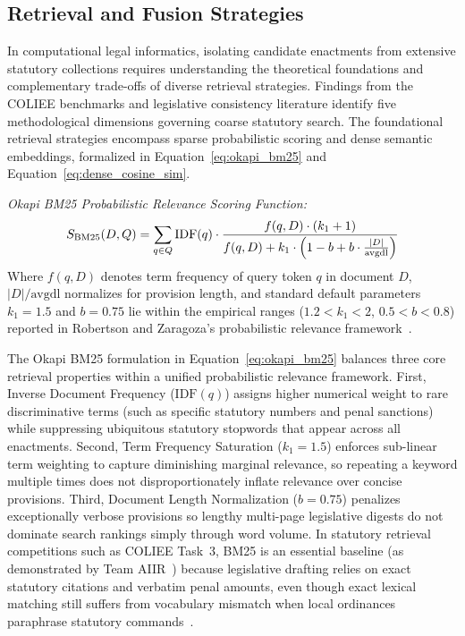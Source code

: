     \subsection{Retrieval and Fusion Strategies}
    \label{sec:retrieval_paradigms_fusion}
    In computational legal informatics, isolating candidate enactments from extensive statutory collections requires understanding the theoretical foundations and complementary trade-offs of diverse retrieval strategies. Findings from the COLIEE benchmarks and legislative consistency literature identify five methodological dimensions governing coarse statutory search. The foundational retrieval strategies encompass sparse probabilistic scoring and dense semantic embeddings, formalized in Equation~\eqref{eq:okapi_bm25} and Equation~\eqref{eq:dense_cosine_sim}.

    \noindent\textit{Okapi BM25 Probabilistic Relevance Scoring Function:}
    \begin{equation}
        S_{\text{BM25}}(D, Q) = \sum_{q \in Q} \text{IDF}(q) \cdot \frac{f(q, D) \cdot (k_1 + 1)}{f(q, D) + k_1 \cdot \left(1 - b + b \cdot \frac{|D|}{\text{avgdl}}\right)}
        \label{eq:okapi_bm25}
        \eqcaption{Okapi BM25 Probabilistic Relevance Scoring Function}
    \end{equation}
    \noindent Where $f(q, D)$ denotes term frequency of query token $q$ in document $D$, $|D|/\text{avgdl}$ normalizes for provision length, and standard default parameters $k_1 = 1.5$ and $b = 0.75$ lie within the empirical ranges ($1.2 < k_1 < 2$, $0.5 < b < 0.8$) reported in Robertson and Zaragoza's probabilistic relevance framework~\cite{robertson2009probabilistic}. 
    
    The Okapi BM25 formulation in Equation~\eqref{eq:okapi_bm25} balances three core retrieval properties within a unified probabilistic relevance framework. First, Inverse Document Frequency ($\text{IDF}(q)$) assigns higher numerical weight to rare discriminative terms (such as specific statutory numbers and penal sanctions) while suppressing ubiquitous statutory stopwords that appear across all enactments. Second, Term Frequency Saturation ($k_1 = 1.5$) enforces sub-linear term weighting to capture diminishing marginal relevance, so repeating a keyword multiple times does not disproportionately inflate relevance over concise provisions. Third, Document Length Normalization ($b = 0.75$) penalizes exceptionally verbose provisions so lengthy multi-page legislative digests do not dominate search rankings simply through word volume. In statutory retrieval competitions such as COLIEE Task~3, BM25 is an essential baseline (as demonstrated by Team AIIR~\cite{wu2025aiir}) because legislative drafting relies on exact statutory citations and verbatim penal amounts, even though exact lexical matching still suffers from vocabulary mismatch when local ordinances paraphrase statutory commands~\cite{blair1985an, manning2008introduction}.

